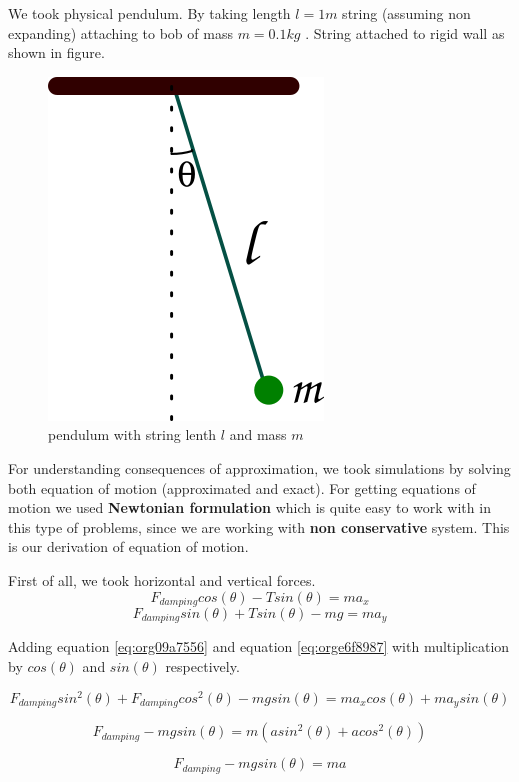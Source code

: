 \documentclass[11pt,a4paper]{article}
\begin{document}
We took physical pendulum. By taking length \(l = 1 m\) string (assuming non expanding) attaching to bob of mass \(m = 0.1 kg\) . String attached to rigid wall as shown in figure. 

\begin{figure}[htbp]
\centering
\includegraphics[width=0.3 \textwidth]{./figure1.png}
\caption{\label{fig:org6be9dbd}pendulum with string lenth \(l\) and mass \(m\)}
\end{figure}

For understanding consequences of approximation, we took simulations by solving both equation of motion (approximated and exact). For getting equations of motion we used \textbf{Newtonian formulation} which is quite easy to work with in this type of problems, since we are working with \textbf{non conservative} system. This is our derivation of equation of motion.

First of all, we took horizontal and vertical forces.
\begin{equation}
\label{eq:org09a7556}
   F_{damping}cos(\theta)-Tsin(\theta)=ma_{x}
\end{equation}
\begin{equation}
\label{eq:orge6f8987}
   F_{damping}sin(\theta)+Tsin(\theta)-mg=ma_{y}
\end{equation}

Adding equation \ref{eq:org09a7556} and equation \ref{eq:orge6f8987} with multiplication by \(cos(\theta)\) and \(sin(\theta)\) respectively.

\begin{equation*}
\label{eq:org5a23d30}
F_{damping}sin^{2}(\theta)+F_{damping}cos^{2}(\theta)-mgsin(\theta)=ma_{x}cos(\theta)+ma_{y}sin(\theta)
\end{equation*}

\begin{equation*}
\label{eq:org7279efb}
F_{damping}-mgsin(\theta)=m(asin^{2}(\theta)+acos^{2}(\theta))
\end{equation*}

\begin{equation}
\label{eq:orgaee488c}
F_{damping}-mgsin(\theta)=ma
\end{equation}
\end{document}
